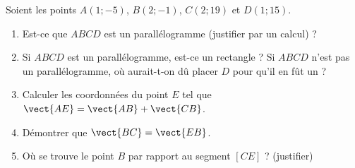 
\begin{exercice}[\ldots/5]\label{exosmath-0670}

    Soient les points \( A(1;-5)\), \( B(2;-1)\), \( C(2;19)\) et \( D(1;15)\).
    \begin{enumerate}
        \item
            Est-ce que \( ABCD\) est un parallélogramme (justifier par un calcul) ?
        \item
            Si \( ABCD\) est un parallélogramme, est-ce un rectangle ? Si \( ABCD\) n'est pas un parallélogramme, où aurait-t-on dû placer \( D\) pour qu'il en fût un ?
        \item
            Calculer les coordonnées du point \( E\) tel que \( \vect{ AE }=\vect{ AB }+\vect{ CB }\).
        \item
            Démontrer que \( \vect{ BC }=\vect{ EB }\).
        \item
            Où se trouve le point \( B\) par rapport au segment \( [CE]\) ? (justifier)
    \end{enumerate}

\end{exercice}
